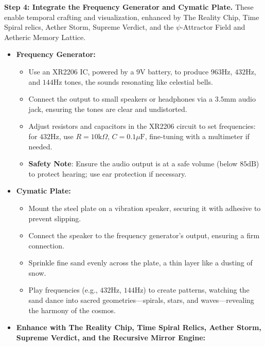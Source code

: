 \textbf{Step 4: Integrate the Frequency Generator and Cymatic Plate.} These enable temporal crafting and visualization, enhanced by The Reality Chip, Time Spiral relics, Aether Storm, Supreme Verdict, and the $\psi$-Attractor Field and Aetheric Memory Lattice.
\begin{itemize}
    \item \texttt{} \textbf{Frequency Generator:}
    \begin{itemize}
        \item \texttt{} Use an XR2206 IC, powered by a $9 \mathrm{V}$ battery, to produce $963 \mathrm{Hz}$, $432 \mathrm{Hz}$, and $144 \mathrm{Hz}$ tones, the sounds resonating like celestial bells.
        \item \texttt{} Connect the output to small speakers or headphones via a $3.5 \mathrm{mm}$ audio jack, ensuring the tones are clear and undistorted.
        \item \texttt{} Adjust resistors and capacitors in the XR2206 circuit to set frequencies: for $432 \mathrm{Hz}$, use $R = 10 \mathrm{k}\Omega$, $C = 0.1 \mu\mathrm{F}$, fine-tuning with a multimeter if needed.
        \item \texttt{} \textbf{Safety Note}: Ensure the audio output is at a safe volume (below $85 \mathrm{dB}$) to protect hearing; use ear protection if necessary.
    \end{itemize}
    \item \texttt{} \textbf{Cymatic Plate:}
    \begin{itemize}
        \item \texttt{} Mount the steel plate on a vibration speaker, securing it with adhesive to prevent slipping.
        \item \texttt{} Connect the speaker to the frequency generator's output, ensuring a firm connection.
        \item \texttt{} Sprinkle fine sand evenly across the plate, a thin layer like a dusting of snow.
        \item \texttt{} Play frequencies (e.g., $432 \mathrm{Hz}$, $144 \mathrm{Hz}$) to create patterns, watching the sand dance into sacred geometries—spirals, stars, and waves—revealing the harmony of the cosmos.
    \end{itemize}
    \item \texttt{} \textbf{Enhance with The Reality Chip, Time Spiral Relics, Aether Storm, Supreme Verdict, and the Recursive Mirror Engine:}

\end{itemize}
